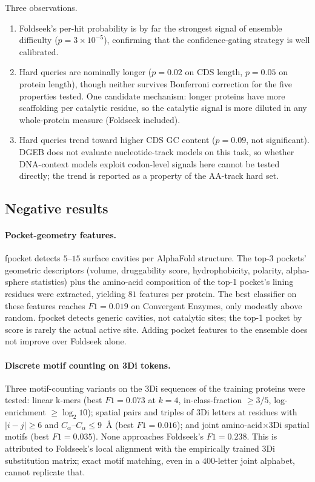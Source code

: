 \documentclass[11pt,letterpaper]{article}
\begin{document}
Three observations.

\begin{enumerate}
\item Foldseek's per-hit probability is by far the strongest signal of
      ensemble difficulty ($p = 3 \times 10^{-5}$), confirming that the
      confidence-gating strategy is well calibrated.
\item Hard queries are nominally longer ($p = 0.02$ on CDS length,
      $p = 0.05$ on protein length), though neither survives Bonferroni
      correction for the five properties tested. One candidate
      mechanism: longer proteins have more scaffolding per catalytic
      residue, so the catalytic signal is more diluted in any
      whole-protein measure (Foldseek included).
\item Hard queries trend toward higher CDS GC content ($p = 0.09$, not
      significant). DGEB does not evaluate nucleotide-track models on
      this task, so whether DNA-context models exploit codon-level
      signals here cannot be tested directly; the trend is reported as
      a property of the AA-track hard set.
\end{enumerate}

\subsection{Negative results}

\paragraph{Pocket-geometry features.}
fpocket \citep{leguilloux2009fpocket} detects $5$--$15$ surface
cavities per AlphaFold structure. The top-3 pockets' geometric
descriptors (volume, druggability score, hydrophobicity, polarity,
alpha-sphere statistics) plus the amino-acid composition of the top-1
pocket's lining residues were extracted, yielding $81$ features per
protein. The best classifier on these features reaches $F1 = 0.019$
on Convergent Enzymes, only modestly above random. fpocket detects
generic cavities, not catalytic sites; the top-1 pocket by score is
rarely the actual active site. Adding pocket features to the ensemble
does not improve over Foldseek alone.

\paragraph{Discrete motif counting on 3Di tokens.}
Three motif-counting variants on the 3Di sequences of the training
proteins were tested: linear k-mers (best $F1 = 0.073$ at $k = 4$,
in-class-fraction $\geq 3/5$, log-enrichment $\geq \log_2 10$);
spatial pairs and triples of 3Di letters at residues with $|i-j| \geq 6$
and $C_\alpha\text{--}C_\alpha \leq 9$~\AA{} (best $F1 = 0.016$);
and joint amino-acid$\times$3Di spatial motifs (best $F1 = 0.035$).
None approaches Foldseek's $F1 = 0.238$. This is attributed to
Foldseek's local alignment with the empirically trained 3Di
substitution matrix; exact motif matching, even in a $400$-letter
joint alphabet, cannot replicate that.
\end{document}
